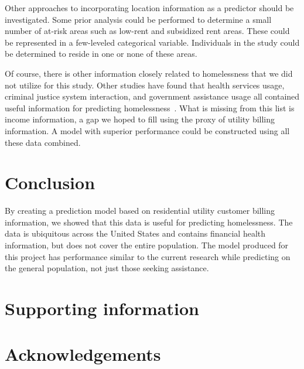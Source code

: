 \documentclass[10pt,letterpaper]{article}
\begin{document}
Other approaches to incorporating location information as a predictor should be investigated. Some prior analysis could be performed to determine a small number of at-risk areas such as low-rent and subsidized rent areas. These could be represented in a few-leveled categorical variable. Individuals in the study could be determined to reside in one or none of these areas.

Of course, there is other information closely related to homelessness that we did not utilize for this study. Other studies have found that health services usage, criminal justice system interaction, and government assistance usage all contained useful information for predicting homelessness~\cite{byrne2020classification,flaming2011crisis,hong2018applications,shinn2013efficient,vanberlo2021interpretable}. What is missing from this list is income information, a gap we hoped to fill using the proxy of utility billing information. A model with superior performance could be constructed using all these data combined. 

\section*{Conclusion}
By creating a prediction model based on residential utility customer billing information, we showed that this data is useful for predicting homelessness. The data is ubiquitous across the United States and contains financial health information, but does not cover the entire population. The model produced for this project has performance similar to the current research while predicting on the general population, not just those seeking assistance.

\section*{Supporting information}


\section*{Acknowledgements}

\nolinenumbers

%
%
% 




\end{document}
